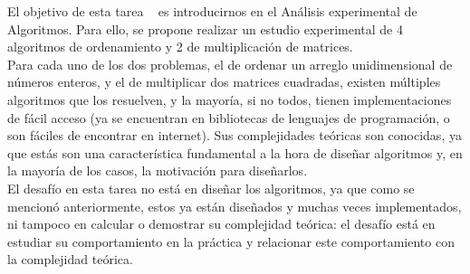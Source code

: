 El objetivo de esta tarea \tnum~ es introducirnos
en el Análisis experimental de Algoritmos. Para ello,
se propone realizar un estudio experimental de 4 algoritmos
de ordenamiento y 2 de multiplicación de matrices. \\

Para cada uno de los dos problemas, el de ordenar un arreglo unidimensional de números enteros, y el de multiplicar dos matrices cuadradas, existen múltiples algoritmos que los resuelven, y la mayoría, si no todos, tienen implementaciones de fácil acceso (ya se encuentran en bibliotecas de lenguajes de programación, o son fáciles de encontrar en internet). Sus complejidades teóricas son conocidas, ya que estás son una característica fundamental a la hora de diseñar algoritmos y, en la mayoría de los casos, la motivación para diseñarlos. \\

El desafío en esta tarea no está en diseñar los algoritmos, ya que como se mencionó anteriormente, estos ya están diseñados y muchas veces implementados, ni tampoco en calcular o demostrar su complejidad teórica: el desafío está en estudiar su comportamiento en la práctica y relacionar este comportamiento con la complejidad teórica. \\





